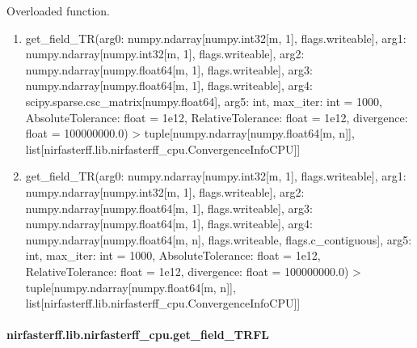 \documentclass[letterpaper,10pt,english]{sphinxmanual}
\begin{document}
\begin{fulllineitems}
\label{\detokenize{_autosummary/nirfasterff.lib.nirfasterff_cpu.get_field_TR:nirfasterff.lib.nirfasterff_cpu.get_field_TR}}
\pysigstartsignatures
{}
\pysigstopsignatures
\sphinxAtStartPar
Overloaded function.
\begin{enumerate}
%
\item {} 
\sphinxAtStartPar
get\_field\_TR(arg0: numpy.ndarray{[}numpy.int32{[}m, 1{]}, flags.writeable{]}, arg1: numpy.ndarray{[}numpy.int32{[}m, 1{]}, flags.writeable{]}, arg2: numpy.ndarray{[}numpy.float64{[}m, 1{]}, flags.writeable{]}, arg3: numpy.ndarray{[}numpy.float64{[}m, 1{]}, flags.writeable{]}, arg4: scipy.sparse.csc\_matrix{[}numpy.float64{]}, arg5: int, max\_iter: int = 1000, AbsoluteTolerance: float = 1e\sphinxhyphen{}12, RelativeTolerance: float = 1e\sphinxhyphen{}12, divergence: float = 100000000.0) \sphinxhyphen{}\textgreater{} tuple{[}numpy.ndarray{[}numpy.float64{[}m, n{]}{]}, list{[}nirfasterff.lib.nirfasterff\_cpu.ConvergenceInfoCPU{]}{]}

\item {} 
\sphinxAtStartPar
get\_field\_TR(arg0: numpy.ndarray{[}numpy.int32{[}m, 1{]}, flags.writeable{]}, arg1: numpy.ndarray{[}numpy.int32{[}m, 1{]}, flags.writeable{]}, arg2: numpy.ndarray{[}numpy.float64{[}m, 1{]}, flags.writeable{]}, arg3: numpy.ndarray{[}numpy.float64{[}m, 1{]}, flags.writeable{]}, arg4: numpy.ndarray{[}numpy.float64{[}m, n{]}, flags.writeable, flags.c\_contiguous{]}, arg5: int, max\_iter: int = 1000, AbsoluteTolerance: float = 1e\sphinxhyphen{}12, RelativeTolerance: float = 1e\sphinxhyphen{}12, divergence: float = 100000000.0) \sphinxhyphen{}\textgreater{} tuple{[}numpy.ndarray{[}numpy.float64{[}m, n{]}{]}, list{[}nirfasterff.lib.nirfasterff\_cpu.ConvergenceInfoCPU{]}{]}

\end{enumerate}

\end{fulllineitems}


\sphinxstepscope


\paragraph{nirfasterff.lib.nirfasterff\_cpu.get\_field\_TRFL}
\label{\detokenize{_autosummary/nirfasterff.lib.nirfasterff_cpu.get_field_TRFL:nirfasterff-lib-nirfasterff-cpu-get-field-trfl}}\label{\detokenize{_autosummary/nirfasterff.lib.nirfasterff_cpu.get_field_TRFL::doc}}
\end{document}
